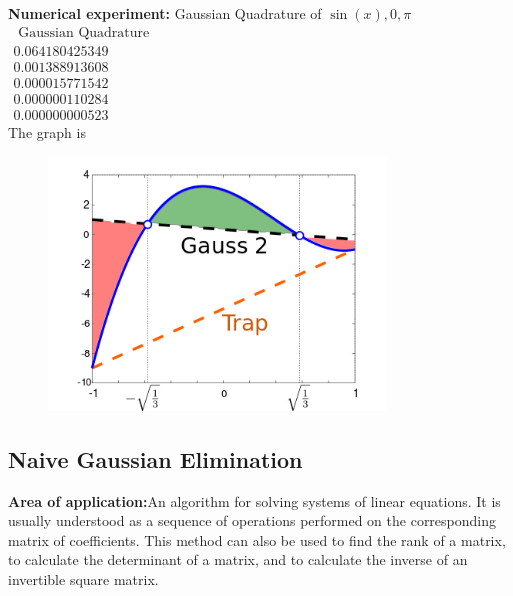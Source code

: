 \documentclass{article}
\begin{document}
{\bf Numerical experiment:}
Gaussian Quadrature of $ \sin(x), 0, \pi $\\$\begin{array} { l } { \text { Gaussian Quadrature } } \\ { 0.064180425349 } \\ { 0.001388913608 } \\ { 0.000015771542 } \\ { 0.000000110284 } \\ { 0.000000000523 } \end{array}$\\
The graph is
\begin{figure}[H]
	\includegraphics[width=0.8\textwidth, height=0.6\textwidth]{g_quad.png}
\end{figure}
	\subsection{Naive Gaussian Elimination}
{\bf Area of application:}An algorithm for solving systems of linear equations. It is usually understood as a sequence of operations performed on the corresponding matrix of coefficients. This method can also be used to find the rank of a matrix, to calculate the determinant of a matrix, and to calculate the inverse of an invertible square matrix. 
\end{document}
